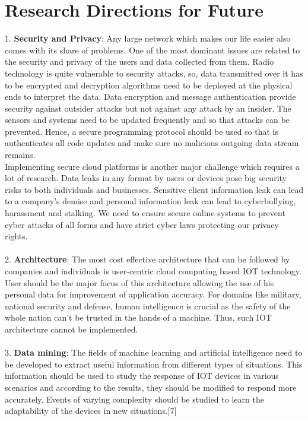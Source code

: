\documentclass[conference]{IEEEtran}
\begin{document}
\section{Research Directions for Future}
1. \textbf{Security and Privacy}: Any large network which makes our life easier also comes with its share of problems. One of the most dominant issues are related to the security and privacy of the users and data collected from them. Radio technology is quite vulnerable to security attacks, so, data transmitted over it has to be encrypted and decryption algorithms need to be deployed at the physical ends to interpret the data. Data encryption and message authentication provide security against outsider attacks but not against any attack by an insider. The sensors and systems need to be updated frequently and so that attacks can be prevented. Hence, a secure programming protocol should be used so that is authenticates all code updates and make sure no malicious outgoing data stream remains. \\
Implementing secure cloud platforms is another major challenge which requires a lot of research. Data leaks in any format by users or devices pose big security risks to both individuals and businesses. Sensitive client information leak can lead to a company’s demise and personal information leak can lead to cyberbullying, harassment and stalking. We need to ensure secure online systems to prevent cyber attacks of all forms and have strict cyber laws protecting our privacy rights.\\\\
2. \textbf{Architecture}: The most cost effective architecture that can be followed by companies and individuals is user-centric cloud computing based IOT technology. User should be the major focus of this architecture allowing the use of his personal data for improvement of application accuracy. For domains like military, national security and defense, human intelligence is crucial as the safety of the whole nation can’t be trusted in the hands of a machine. Thus, such IOT architecture cannot be implemented.\\\\
3. \textbf{Data mining}: The fields of machine learning and artificial intelligence need to be developed to extract useful information from different types of situations. This information should be used to study the response of IOT devices in various scenarios and according to the results, they should be modified to respond more accurately. Events of varying complexity should be studied to learn the adaptability of the devices in new situations.[7]
\end{document}
